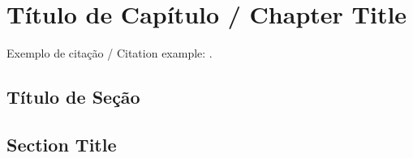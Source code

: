 \chapter{Título de Capítulo / Chapter Title}

Exemplo de citação / Citation example: \cite{reporttemplate}.

\section{Título de Seção}
\section{Section Title}

\pagebreak



